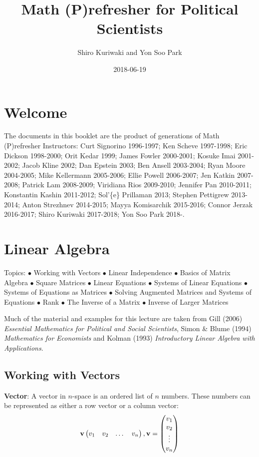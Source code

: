 \documentclass[]{book}
\title{Math (P)refresher for Political Scientists}
\author{Shiro Kuriwaki and Yon Soo Park}
\date{2018-06-19}
\theoremstyle{definition}
\theoremstyle{definition}
\theoremstyle{definition}
\theoremstyle{remark}
\begin{document}
\maketitle

{
\setcounter{tocdepth}{1}
\tableofcontents
}
\chapter{Welcome}\label{welcome}

The documents in this booklet are the product of generations of Math
(P)refresher Instructors: Curt Signorino 1996-1997; Ken Scheve
1997-1998; Eric Dickson 1998-2000; Orit Kedar 1999; James Fowler
2000-2001; Kosuke Imai 2001-2002; Jacob Kline 2002; Dan Epstein 2003;
Ben Ansell 2003-2004; Ryan Moore 2004-2005; Mike Kellermann 2005-2006;
Ellie Powell 2006-2007; Jen Katkin 2007-2008; Patrick Lam 2008-2009;
Viridiana Rios 2009-2010; Jennifer Pan 2010-2011; Konstantin Kashin
2011-2012; Sol'\{e\} Prillaman 2013; Stephen Pettigrew 2013-2014; Anton
Strezhnev 2014-2015; Mayya Komisarchik 2015-2016; Connor Jerzak
2016-2017; Shiro Kuriwaki 2017-2018; Yon Soo Park 2018-.

\chapter{Linear Algebra}\label{linear-algebra}

Topics: \(\bullet\) Working with Vectors \(\bullet\) Linear Independence
\(\bullet\) Basics of Matrix Algebra \(\bullet\) Square Matrices
\(\bullet\) Linear Equations \(\bullet\) Systems of Linear Equations
\(\bullet\) Systems of Equations as Matrices \(\bullet\) Solving
Augmented Matrices and Systems of Equations \(\bullet\) Rank \(\bullet\)
The Inverse of a Matrix \(\bullet\) Inverse of Larger Matrices

Much of the material and examples for this lecture are taken from Gill
(2006) \emph{Essential Mathematics for Political and Social Scientists},
Simon \& Blume (1994) \emph{Mathematics for Economists} and Kolman
(1993) \emph{Introductory Linear Algebra with Applications}.

\section{Working with Vectors}\label{working-with-vectors}

\textbf{Vector}: A vector in \(n\)-space is an ordered list of \(n\)
numbers. These numbers can be represented as either a row vector or a
column vector:
\[ {\bf v} \begin{pmatrix} v_1 & v_2 & \dots & v_n\end{pmatrix} , {\bf v} = \begin{pmatrix} v_1 \\ v_2 \\ \vdots \\ v_n \end{pmatrix}\]
\end{document}
